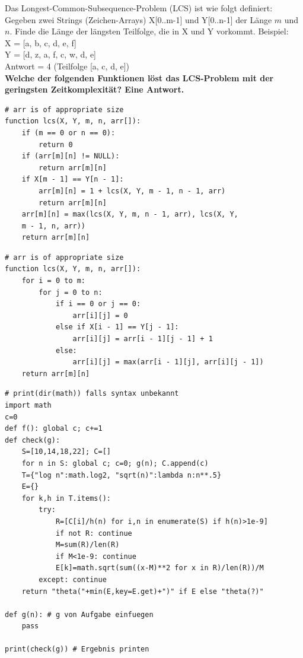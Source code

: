 \begin{contentbox}
Das Longest-Common-Subsequence-Problem (LCS) ist wie folgt definiert: Gegeben zwei Strings (Zeichen-Arrays) X[0..m-1] und Y[0..n-1] der Länge $m$ und $n$. Finde die Länge der längsten Teilfolge, die in X und Y vorkommt.
Beispiel: \\
X = [a, b, c, d, e, f] \\
Y = [d, z, a, f, c, w, d, e] \\
Antwort = 4 (Teilfolge [a, c, d, e])\\
\textbf{Welche der folgenden Funktionen löst das LCS-Problem mit der geringsten Zeitkomplexität? Eine Antwort.}
\end{contentbox}
\begin{codebox}
\begin{lstlisting}[style=CodeExpert]
# arr is of appropriate size
function lcs(X, Y, m, n, arr[]):
    if (m == 0 or n == 0):
        return 0
    if (arr[m][n] != NULL):
        return arr[m][n]
    if X[m - 1] == Y[n - 1]:
        arr[m][n] = 1 + lcs(X, Y, m - 1, n - 1, arr)
        return arr[m][n]
    arr[m][n] = max(lcs(X, Y, m, n - 1, arr), lcs(X, Y,
    m - 1, n, arr))
    return arr[m][n]
\end{lstlisting}
\end{codebox}
\begin{codebox}
\begin{lstlisting}[style=CodeExpert]
# arr is of appropriate size
function lcs(X, Y, m, n, arr[]):
    for i = 0 to m:
        for j = 0 to n:
            if i == 0 or j == 0:
                arr[i][j] = 0
            else if X[i - 1] == Y[j - 1]:
                arr[i][j] = arr[i - 1][j - 1] + 1
            else:
                arr[i][j] = max(arr[i - 1][j], arr[i][j - 1])
    return arr[m][n]
\end{lstlisting}
\end{codebox}



\begin{codebox}
\begin{lstlisting}[style=CodeExpert, extendedchars=true, inputencoding=utf8]
# print(dir(math)) falls syntax unbekannt
import math
c=0
def f(): global c; c+=1
def check(g):
    S=[10,14,18,22]; C=[]
    for n in S: global c; c=0; g(n); C.append(c)
    T={"log n":math.log2, "sqrt(n)":lambda n:n**.5}
    E={}
    for k,h in T.items():
        try:
            R=[C[i]/h(n) for i,n in enumerate(S) if h(n)>1e-9]
            if not R: continue
            M=sum(R)/len(R)
            if M<1e-9: continue
            E[k]=math.sqrt(sum((x-M)**2 for x in R)/len(R))/M
        except: continue
    return "theta("+min(E,key=E.get)+")" if E else "theta(?)"

def g(n): # g von Aufgabe einfuegen
    pass

print(check(g)) # Ergebnis printen
\end{lstlisting}
\end{codebox}




